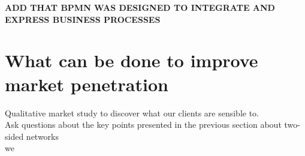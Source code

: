 \documentclass[10pt]{report}
\begin{document}
\textbf{ADD THAT BPMN WAS DESIGNED TO INTEGRATE AND EXPRESS BUSINESS PROCESSES}

\section{What can be done to improve market penetration}
Qualitative market study to discover what our clients are sensible to.\\
Ask questions about the key points presented in the previous section about two-sided networks\\

we 

\newpage

\newpage

\pagestyle{plain}

\nocite{*}
\setlength{\bibitemsep}{5pt}

\printbibliography[title={Technological references},keyword={tech}, heading=subbibliography]
\printbibliography[title={Strategic references},keyword={strat}, heading=subbibliography]

\printbibliography[title={Other references}, notkeyword={tech}, notkeyword={strat}, heading=subbibliography]
\end{document}
